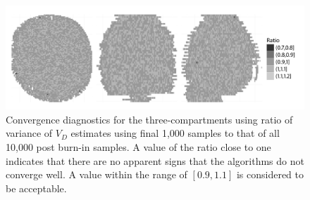 \begin{figure}[t]
  \UseAltLinespread
  \includegraphics[width=\linewidth]{fig_src/PET_Converge}
  \caption[Convergence diagnostics for the random walk algorithm for the
  \protect\pet compartmental model using summary statistics]
  {Convergence diagnostics for the three-compartments \pet using ratio of variance of $V_D$ estimates using final 1,000 samples to that of all 10,000 post burn-in samples. A value of the ratio close to one indicates that there are no apparent signs that the \mcmc algorithms do not converge well. A value within the range of $[0.9, 1.1]$ is considered to be acceptable.}
  \label{fig:pet diag ratio}
\end{figure}

